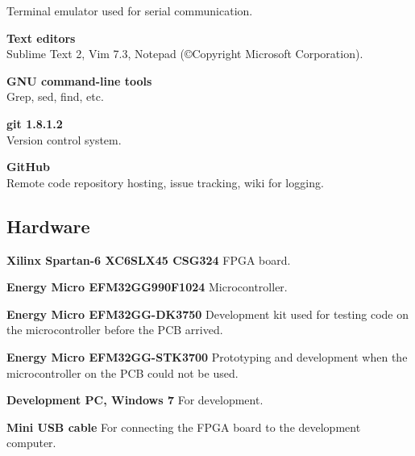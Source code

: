 \begin{description}
        Terminal emulator used for serial communication.
    \item{\textbf{Text editors}} \\
        Sublime Text 2, Vim 7.3, Notepad (©Copyright Microsoft Corporation).
    \item{\textbf{GNU command-line tools}} \\
        Grep, sed, find, etc.
    \item{\textbf{git 1.8.1.2}} \\
        Version control system.
    \item{\textbf{GitHub}} \\
        Remote code repository hosting, issue tracking, wiki for logging.
\end{description}

\subsection{Hardware}
\begin{description}
\item{\textbf{Xilinx Spartan-6 XC6SLX45 CSG324}}
    FPGA board.
\item{\textbf{Energy Micro EFM32GG990F1024}}
    Microcontroller.
\item{\textbf{Energy Micro EFM32GG-DK3750}}
    Development kit used for testing code on the microcontroller before the PCB arrived.
\item{\textbf{Energy Micro EFM32GG-STK3700}}
    Prototyping and development when the microcontroller on the PCB could not be used.
\item{\textbf{Development PC, Windows 7}}
    For development.
\item{\textbf{Mini USB cable}}
    For connecting the FPGA board to the development computer.
\end{description}
